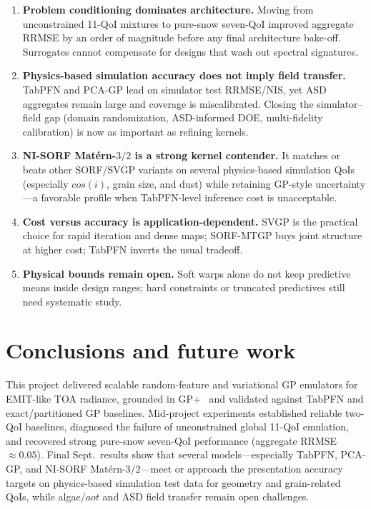 \documentclass[11pt]{article}
\begin{document}
\begin{enumerate}[leftmargin=1.3em]
  \item \textbf{Problem conditioning dominates architecture.}
        Moving from unconstrained 11-QoI mixtures to pure-snow seven-QoI improved
        aggregate RRMSE by an order of magnitude before any final architecture bake-off.
        Surrogates cannot compensate for designs that wash out spectral signatures.
  \item \textbf{Physics-based simulation  accuracy does not imply field transfer.}
        TabPFN and PCA-GP lead on simulator test RRMSE/NIS, yet ASD aggregates remain
        large and coverage is miscalibrated.
        Closing the simulator--field gap (domain randomization, ASD-informed DOE,
        multi-fidelity calibration) is now as important as refining kernels.
  \item \textbf{NI-SORF Mat\'ern-$3/2$ is a strong kernel contender.}
        It matches or beats other SORF/SVGP variants on several physics-based simulation QoIs
        (especially $cos(i)$, grain size, and dust) while retaining GP-style
        uncertainty---a favorable profile when TabPFN-level inference cost is
        unacceptable.
  \item \textbf{Cost versus accuracy is application-dependent.}
        SVGP is the practical choice for rapid iteration and dense maps; SORF-MTGP buys
        joint structure at higher cost; TabPFN inverts the usual tradeoff.
  \item \textbf{Physical bounds remain open.}
        Soft warps alone do not keep predictive means inside design ranges; hard
        constraints or truncated predictives still need systematic study.
\end{enumerate}

\section{Conclusions and future work}
\label{sec:conclusion}

This project delivered scalable random-feature and variational GP emulators for
EMIT-like TOA radiance, grounded in GP$+$~\cite{yousefpour2024gpplus} and validated
against TabPFN and exact/partitioned GP baselines.
Mid-project experiments established reliable two-QoI baselines, diagnosed the failure
of unconstrained global 11-QoI emulation, and recovered strong pure-snow seven-QoI
performance (aggregate RRMSE $\approx0.05$).
Final Sept.\ results show that several models---especially TabPFN, PCA-GP, and
NI-SORF Mat\'ern-$3/2$---meet or approach the presentation accuracy targets on
physics-based simulation test data for geometry and grain-related QoIs, while algae/$aot$ and
ASD field transfer remain open challenges.
\end{document}
